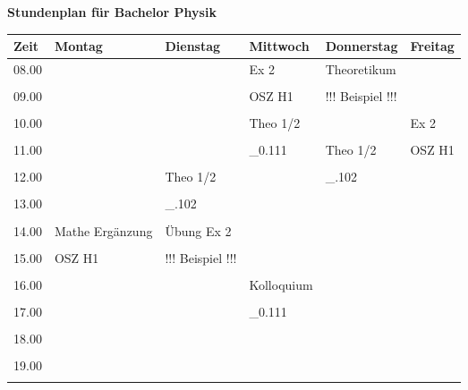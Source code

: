\begin{sideways}
\begin{minipage}{1\textheight}
\centering \textbf{\Large Stundenplan für Bachelor Physik}\bigskip\\
\begin{tabular}{|p{.05\textheight}||p{.16\textheight}|p{.16\textheight}|p{.16\textheight}|p{.16\textheight}|p{.16\textheight}|}\hline
 Zeit 		& Montag 			& Dienstag 			& Mittwoch 		& Donnerstag 		& Freitag	\\ \hline\hline
{08.00} 	& 					&					&  {Ex 2}		& {Theoretikum} 	&  			\\
&&&&&\\ \cline{1-3} \cline{6-6}
{09.00} 	& 					&					&  {OSZ H1}		& {!!! Beispiel !!!}&			\\
&&&&&\\ \cline{1-6}
{10.00} 	& 	 				&  					& {Theo 1/2}	& 					& {Ex 2}	\\
&&&&&\\ \cline{1-3}\cline{5-5}
{11.00} 	& 	 				& 					& {\_0.111} 	&  {Theo 1/2}		& {OSZ H1}	\\
&&&&&\\ \cline{1-4} \cline{6-6}
{12.00} 	& 					& {Theo 1/2}		& 	 			& {\_.102}			& 			\\
&&&&&\\ \cline{1-2} \cline{4-6}
{13.00} 	&					& 	{\_.102}		& 				& 					&  			\\
&&&&&\\ \hline
{14.00} 	& {Mathe Ergänzung} &{Übung Ex 2}		& 				&  					& 			\\
&&&&&\\ \cline{1-1}  \cline{4-6}
{15.00} 	& {OSZ H1}	 		&{!!! Beispiel !!!}	& 				&	  				& 			\\
&&&&&\\ \hline
 {16.00} 	&  					&  					& {Kolloquium} 	&  					& 			\\
&&&&&\\ \cline{1-3} \cline{5-6}
 {17.00} 	&  					&  					& {\_0.111} 	&  					& 			\\
&&&&&\\ \hline
 {18.00} 	&  					&	  				& 		 		&		  			& 			\\
&&&&&\\ \hline
 {19.00} 	&  					&  					&  				& 					& 			\\
&&&&&\\ \hline
\end{tabular}
\end{minipage}
\end{sideways}
